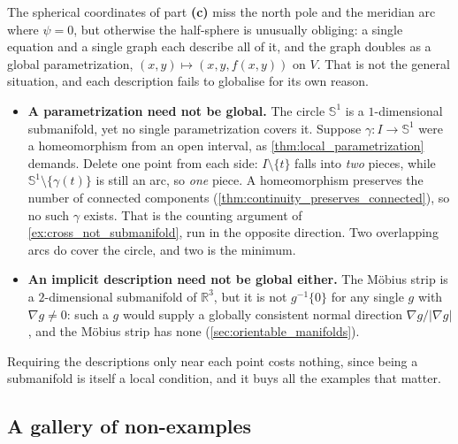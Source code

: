 \begin{remark}
\label{rem:why_submanifolds_are_local}
The spherical coordinates of part \textbf{(c)} miss the north pole and the meridian arc where
$\psi = 0$, but otherwise the half-sphere is unusually obliging: a single equation and a single
graph each describe all of it, and the graph doubles as a global parametrization,
$(x,y) \mapsto (x,y,f(x,y))$ on $V$. That is not the general situation, and each description
fails to globalise for its own reason.
\begin{itemize}
  \item \textbf{A parametrization need not be global.} The circle $\mathbb{S}^1$ is a
    $1$-dimensional submanifold, yet no single parametrization covers it. Suppose
    $\gamma : I \to \mathbb{S}^1$ were a homeomorphism from an open interval, as
    \cref{thm:local_parametrization} demands. Delete one point from each side: $I \setminus \{t\}$
    falls into \emph{two} pieces, while $\mathbb{S}^1 \setminus \{\gamma(t)\}$ is still an arc, so
    \emph{one} piece. A homeomorphism preserves the number of connected components
    (\cref{thm:continuity_preserves_connected}), so no such $\gamma$ exists. That is the counting
    argument of \cref{ex:cross_not_submanifold}, run in the opposite direction. Two overlapping
    arcs do cover the circle, and two is the minimum.
  \item \textbf{An implicit description need not be global either.} The Möbius strip is a
    $2$-dimensional submanifold of $\mathbb{R}^3$, but it is not $g^{-1}\{0\}$ for any single
    $g$ with $\nabla g \neq 0$: such a $g$ would supply a globally consistent normal direction
    $\nabla g/\lvert\nabla g\rvert$, and the Möbius strip has none
    (\cref{sec:orientable_manifolds}).
\end{itemize}
Requiring the descriptions only near each point costs nothing, since being a submanifold is
itself a local condition, and it buys all the examples that matter.
\end{remark}

\subsection{A gallery of non-examples}

